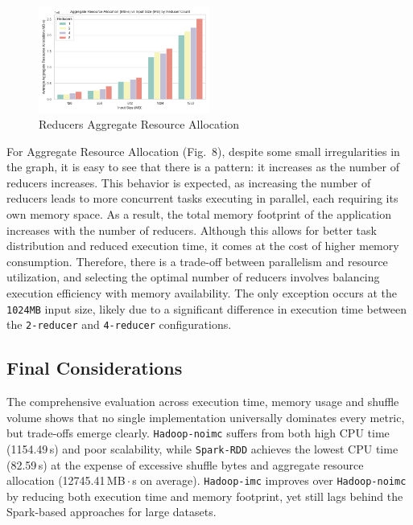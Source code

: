 \begin{figure}[H]
	\centering
	\includegraphics[width=0.5\textwidth]{images/Fig_Reducers_Aggregate_Resource_Allocation.png}
	\caption{Reducers Aggregate Resource Allocation}
	\label{fig:reducer-aggregate-resource-allocation}
\end{figure}

For Aggregate Resource Allocation (Fig.~8), despite some small irregularities in the graph, it is easy to see that there is a pattern: it increases as the number of reducers increases. This behavior is expected, as increasing the number of reducers leads to more concurrent tasks executing in parallel, each requiring its own memory space. As a result, the total memory footprint of the application increases with the number of reducers. Although this allows for better task distribution and reduced execution time, it comes at the cost of higher memory consumption. Therefore, there is a trade-off between parallelism and resource utilization, and selecting the optimal number of reducers involves balancing execution efficiency with memory availability. The only exception occurs at the \texttt{1024MB} input size, likely due to a significant difference in execution time between the \texttt{2-reducer} and \texttt{4-reducer} configurations. 



\subsection{Final Considerations}
The comprehensive evaluation across execution time, memory usage and shuffle volume shows that no single implementation universally dominates every metric, but trade‑offs emerge clearly. \texttt{Hadoop-noimc} suffers from both high CPU time (1154.49\,s) and poor scalability, while \texttt{Spark-RDD} achieves the lowest CPU time (82.59\,s) at the expense of excessive shuffle bytes and aggregate resource allocation (12745.41\,MB\,$\cdot$\,s on average). \texttt{Hadoop-imc} improves over \texttt{Hadoop-noimc} by reducing both execution time and memory footprint, yet still lags behind the Spark-based approaches for large datasets.

